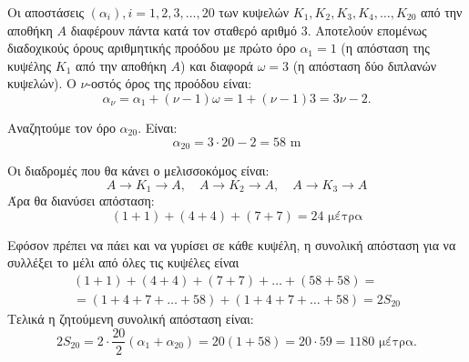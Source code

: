 
\begin{alist}
\item Οι αποστάσεις $(\alpha_i), i = 1, 2, 3, \dots, 20$ των κυψελών $K_1, K_2, K_3, K_4, \dots, K_{20}$ από την αποθήκη $A$ διαφέρουν πάντα κατά τον σταθερό αριθμό $3$. Αποτελούν επομένως διαδοχικούς όρους αριθμητικής προόδου με πρώτο όρο $\alpha_1 = 1$ (η απόσταση της κυψέλης $K_1$ από την αποθήκη $A$) και διαφορά $\omega = 3$ (η απόσταση δύο διπλανών κυψελών).
Ο $\nu$-οστός όρος της προόδου είναι:
\[\alpha_\nu = \alpha_1 + (\nu - 1)\omega = 1 + (\nu - 1)3 = 3\nu - 2.\]

\item Αναζητούμε τον όρο $\alpha_{20}$. Είναι:
\[\alpha_{20} = 3 \cdot 20 - 2 = 58\text{ m}\]

\item
\begin{rlist}
\item Οι διαδρομές που θα κάνει ο μελισσοκόμος είναι:
\[A \to K_1 \to A, \quad A \to K_2 \to A, \quad A \to K_3 \to A\]
Άρα θα διανύσει απόσταση:
\[(1 + 1) + (4 + 4) + (7 + 7) = 24\text{ μέτρα}\]

\item Εφόσον πρέπει να πάει και να γυρίσει σε κάθε κυψέλη, η συνολική απόσταση για να συλλέξει το μέλι από όλες τις κυψέλες είναι
\begin{gather*}
(1 + 1) + (4 + 4) + (7 + 7) + \dots + (58 + 58) = \\
= (1 + 4 + 7 + \dots + 58) + (1 + 4 + 7 + \dots + 58) = 2S_{20}
\end{gather*}
Τελικά η ζητούμενη συνολική απόσταση είναι:
\[2S_{20} = 2 \cdot \dfrac{20}{2}(\alpha_1 + \alpha_{20}) = 20(1 + 58) = 20 \cdot 59 = 1180\text{ μέτρα}.\]
\end{rlist}
\end{alist}

